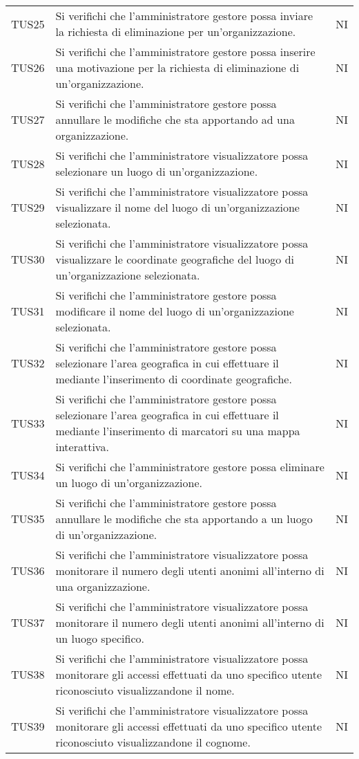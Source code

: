 {\begin{longtable}{ c C{13cm} C{1cm}}
TUS25 & Si verifichi che l'amministratore gestore possa inviare la richiesta di eliminazione per un'organizzazione. & NI \\
TUS26 & Si verifichi che l'amministratore gestore possa inserire una motivazione per la richiesta di eliminazione di un'organizzazione. & NI \\
TUS27 & Si verifichi che l'amministratore gestore possa annullare le modifiche che sta apportando ad una organizzazione. & NI \\
TUS28 & Si verifichi che l’amministratore visualizzatore possa selezionare un luogo di un’organizzazione. & NI \\
TUS29 & Si verifichi che l'amministratore visualizzatore possa visualizzare il nome del luogo di un’organizzazione selezionata. & NI \\
TUS30 & Si verifichi che l'amministratore visualizzatore possa visualizzare le coordinate geografiche del luogo di un’organizzazione selezionata. & NI \\
TUS31 & Si verifichi che l'amministratore gestore possa modificare il nome del luogo di un’organizzazione selezionata. & NI \\
TUS32 & Si verifichi che l'amministratore gestore possa selezionare l'area geografica in cui effettuare il  mediante l'inserimento di coordinate geografiche. & NI \\
TUS33 & Si verifichi che l'amministratore gestore possa selezionare l'area geografica in cui effettuare il  mediante l'inserimento di marcatori su una mappa interattiva. & NI \\
TUS34 & Si verifichi che l'amministratore gestore possa eliminare un luogo di un’organizzazione. & NI \\
TUS35 & Si verifichi che l'amministratore gestore possa annullare le modifiche che sta apportando a un luogo di un’organizzazione.  & NI \\
TUS36 & Si verifichi che l’amministratore visualizzatore possa monitorare il numero degli utenti anonimi all’interno di una organizzazione. & NI \\
TUS37 & Si verifichi che l’amministratore visualizzatore possa monitorare il numero degli utenti anonimi all’interno di un luogo specifico. & NI \\
TUS38 & Si verifichi che l’amministratore visualizzatore possa monitorare gli accessi effettuati da uno specifico utente riconosciuto visualizzandone il nome. & NI \\
TUS39 & Si verifichi che l’amministratore visualizzatore possa monitorare gli accessi effettuati da uno specifico utente riconosciuto visualizzandone il cognome. & NI \\

\end{longtable}}
